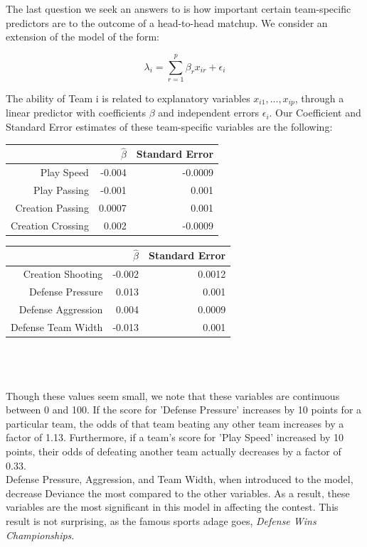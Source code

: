 \documentclass{article}
\begin{document}
 The last question we seek an answers to is how important certain team-specific predictors are to the outcome of a head-to-head matchup. We consider an extension of the model of the form:
 
 $$\lambda_i = \displaystyle\sum_{r=1}^{p} \beta_r x_{ir} + \epsilon_i$$

The ability of Team i is related to explanatory variables $x_{i1},...,x_{ip}$, through a linear predictor with coefficients $\beta$ and independent errors $\epsilon_i$. Our Coefficient and Standard Error estimates of these team-specific variables are the following:

\begin{tabular}{rrr}
  \hline
 & $\hat{\beta}$ & Standard Error \\ 
  \hline
Play Speed  & -0.004 & -0.0009 \\
Play Passing  & -0.001 & 0.001 \\
Creation Passing  & 0.0007 & 0.001 \\
Creation Crossing  & 0.002 & -0.0009 \\
   \hline
\end{tabular}
\quad
\begin{tabular}{rrr}
  \hline
 & $\hat{\beta}$ & Standard Error \\ 
  \hline
Creation Shooting & -0.002 & 0.0012 \\
Defense Pressure  & 0.013 & 0.001 \\
Defense Aggression & 0.004 & 0.0009 \\
Defense Team Width  & -0.013 & 0.001 \\
   \hline
\end{tabular}\\
\\
\\
Though these values seem small, we note that these variables are continuous between 0 and 100. If the score for 'Defense Pressure' increases by 10 points for a particular team, the odds of that team beating any other team increases by a factor of 1.13. Furthermore, if a team's score for 'Play Speed' increased by 10 points, their odds of defeating another team actually decreases by a factor of 0.33.\\

Defense Pressure, Aggression, and Team Width, when introduced to the model, decrease Deviance the most compared to the other variables. As a result, these variables are the most significant in this model in affecting the contest. This result is not surprising, as the famous sports adage goes, \textit{Defense Wins Championships}.\\
\end{document}

